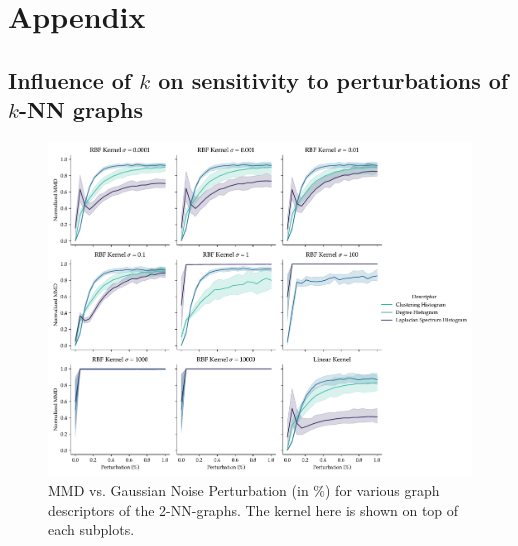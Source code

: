 \chapter{Appendix}

\section{Influence of $k$ on sensitivity to perturbations of $k$-NN graphs}

\begin{figure}[h]
  \centering
  \includegraphics[width=\textwidth]{./figures/results/res_1_5.pdf}
  \caption{MMD vs. Gaussian Noise Perturbation (in \%) for various graph descriptors of the
    2-NN-graphs. The kernel here is shown on top of each subplots.}
  \label{fig:mmd_effect_kernel_knn}
\end{figure}

